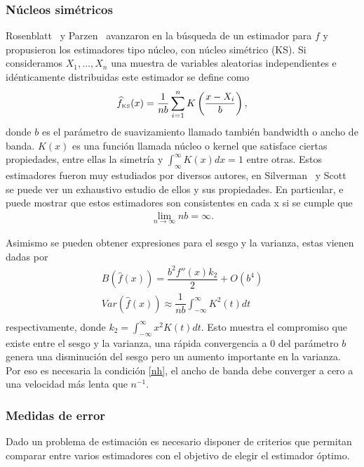 \subsubsection{Núcleos simétricos}
Rosenblatt~\cite{Rosenblatt56}  y Parzen~\cite{Parzen62} avanzaron en la búsqueda de un estimador para $f$ y propusieron los estimadores tipo núcleo, con núcleo simétrico (KS). Si consideramos $X_1,\ldots,X_n$ una muestra de variables aleatorias independientes e idénticamente distribuidas este estimador se define como
\begin{align}
\label{KS}
\widehat{f}_\text{\tiny KS}(x)=\frac{1}{n b} \sum_{i=1}^n K \left(\dfrac{x-X_i}{b}\right),
\end{align}
donde $b$ es el parámetro de suavizamiento llamado también bandwidth o ancho de banda. $K(x)$ es una función llamada núcleo o kernel que satisface ciertas propiedades, entre ellas la simetría y $\int_{\infty}^{\infty} K(x)dx=1$ entre otras. Estos estimadores fueron muy estudiados por diversos autores, en Silverman~\cite{Silverman1986} y Scott~\cite{Scott1992} se puede ver un exhaustivo estudio de ellos y sus propiedades. En particular, e puede mostrar que estos estimadores son consistentes en cada x si se cumple que  
\begin{align}
\label{nh}
\lim\limits_{n\to\infty} nb=\infty.
\end{align}	

Asimismo se pueden obtener expresiones para el sesgo y la varianza, estas vienen dadas por
\begin{align}
\label{SesgoVar}
B(\widehat{f}(x))=\dfrac{b^2 f''(x) k_2}{2}+O(b^4)\\
Var(\widehat{f}(x))\approx \dfrac{1}{nb} \int_{-\infty}^{\infty} K^2(t)dt\\
\end{align}	
respectivamente, donde $k_2=\int_{-\infty}^{\infty} x^2 K(t)dt$. Esto muestra el compromiso que existe entre el sesgo y la varianza, una rápida convergencia a $0$ del parámetro $b$ genera una disminución del sesgo pero un aumento importante en la varianza. Por eso es necesaria la condición \eqref{nh}, el ancho de banda debe converger a cero a una velocidad más lenta que $n^{-1}.$ 

\subsubsection{Medidas de error}

Dado un problema de estimación es necesario disponer de criterios que permitan comparar entre varios estimadores con el objetivo de elegir el estimador óptimo. 

